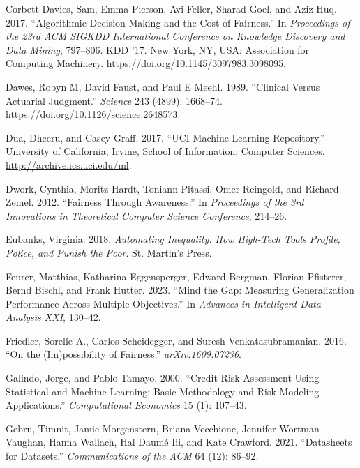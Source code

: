 \begin{CSLReferences}{1}{0}
\leavevmode{}%
Corbett-Davies, Sam, Emma Pierson, Avi Feller, Sharad Goel, and Aziz Huq. 2017. {``Algorithmic Decision Making and the Cost of Fairness.''} In \emph{Proceedings of the 23rd ACM SIGKDD International Conference on Knowledge Discovery and Data Mining}, 797--806. KDD '17. New York, NY, USA: Association for Computing Machinery. \url{https://doi.org/10.1145/3097983.3098095}.

\leavevmode{}%
Dawes, Robyn M, David Faust, and Paul E Meehl. 1989. {``Clinical Versus Actuarial Judgment.''} \emph{Science} 243 (4899): 1668--74. \url{https://doi.org/10.1126/science.2648573}.

\leavevmode{}%
Dua, Dheeru, and Casey Graff. 2017. {``{UCI} Machine Learning Repository.''} University of California, Irvine, School of Information; Computer Sciences. \url{http://archive.ics.uci.edu/ml}.

\leavevmode{}%
Dwork, Cynthia, Moritz Hardt, Toniann Pitassi, Omer Reingold, and Richard Zemel. 2012. {``Fairness Through Awareness.''} In \emph{Proceedings of the 3rd Innovations in Theoretical Computer Science Conference}, 214--26.

\leavevmode{}%
Eubanks, Virginia. 2018. \emph{Automating Inequality: How High-Tech Tools Profile, Police, and Punish the Poor}. St. Martin's Press.

\leavevmode{}%
Feurer, Matthias, Katharina Eggensperger, Edward Bergman, Florian Pfisterer, Bernd Bischl, and Frank Hutter. 2023. {``Mind the Gap: Measuring Generalization Performance Across Multiple Objectives.''} In \emph{Advances in Intelligent Data Analysis XXI}, 130--42.

\leavevmode{}%
Friedler, Sorelle A., Carlos Scheidegger, and Suresh Venkatasubramanian. 2016. {``On the (Im)possibility of Fairness.''} \emph{arXiv:1609.07236}.

\leavevmode{}%
Galindo, Jorge, and Pablo Tamayo. 2000. {``Credit Risk Assessment Using Statistical and Machine Learning: Basic Methodology and Risk Modeling Applications.''} \emph{Computational Economics} 15 (1): 107--43.

\leavevmode{}%
Gebru, Timnit, Jamie Morgenstern, Briana Vecchione, Jennifer Wortman Vaughan, Hanna Wallach, Hal Daumé Iii, and Kate Crawford. 2021. {``Datasheets for Datasets.''} \emph{Communications of the ACM} 64 (12): 86--92.


\end{CSLReferences}
